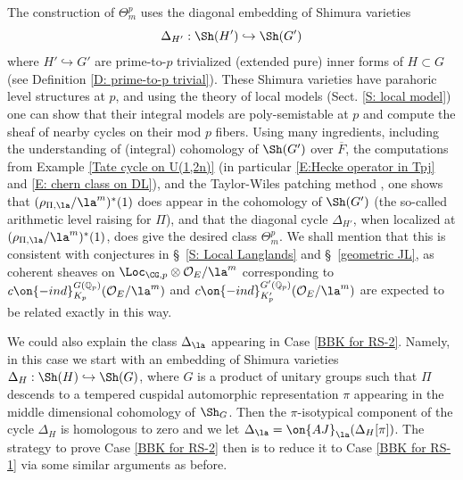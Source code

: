 \documentclass[11pt]{amsart}
\theoremstyle{definition}
\theoremstyle{definition}
\theoremstyle{definition}
\numberwithin{equation}{section}
\newcommand{\quash}[1]{}  %
\newcommand{\bQ}{{\mathbb Q}}
\newcommand{\mO}{{\mathcal O}}
\begin{document}
The construction of $\Theta_m^p$ uses the diagonal embedding of Shimura varieties 
\[
\Delta_{H'}: \Sh(H')\hookrightarrow \Sh(G')
\]
where $H'\hookrightarrow G'$ are prime-to-$p$ trivialized (extended pure) inner forms of $H\subset G$ (see Definition \ref{D: prime-to-p trivial}). These Shimura varieties have parahoric level structures at $p$, and using the theory of local models (Sect. \ref{S: local model}) one can show that their integral models are poly-semistable at $p$ and compute the sheaf of nearby cycles on their mod $p$ fibers. 
Using many ingredients, including the understanding of (integral) cohomology of $\Sh(G')$ over $\overline{F}$, the computations from Example \ref{Tate cycle on U(1,2n)} (in particular \eqref{E:Hecke operator in Tpj} and \eqref{E: chern class on DL}), and the  Taylor-Wiles patching method \cite{LTXZZ-Rigidity}, one shows that $(\rho_{\Pi,\la}/\la^m)^*(1)$ does appear in the cohomology of $\Sh(G')$ (the so-called arithmetic level raising for $\Pi$), and that the diagonal cycle $\Delta_{H'}$, when localized at $(\rho_{\Pi,\la}/\la^m)^*(1)$, does give the desired class $\Theta_m^p$. We shall mention that this is consistent with conjectures in \S~\ref{S: Local Langlands} and \S~\ref{geometric JL}, as coherent sheaves on $\Loc_{\CG,p}\otimes \mO_E/\la^m$ corresponding to $c\on{-ind}_{K_p}^{G(\bQ_p)}(\mO_E/\la^m)$ and $c\on{-ind}_{K'_p}^{G'(\bQ_p)}(\mO_E/\la^m)$ are expected to be related exactly in this way. 

We could also explain the class $\Delta_\la$ appearing in Case \eqref{BBK for RS-2}. Namely, in this case we start with an embedding of Shimura varieties $\Delta_H: \Sh(H)\hookrightarrow\Sh(G)$, where $G$ is a product of unitary groups such that $\Pi$ descends to a tempered cuspidal automorphic representation $\pi$ appearing in the middle dimensional cohomology of $\Sh_G$. Then the $\pi$-isotypical component of the cycle $\Delta_H$ is homologous to zero and we let $\Delta_\la=\on{AJ}_\la(\Delta_H[\pi])$. The strategy to prove Case \eqref{BBK for RS-2} then is to reduce it to Case \eqref{BBK for RS-1} via some similar arguments as before.



\quash{
\begin{ack}
We thank X.
\end{ack}

\begin{funding}
This work was partially supported by~\ldots
\end{funding}
}
\end{document}
